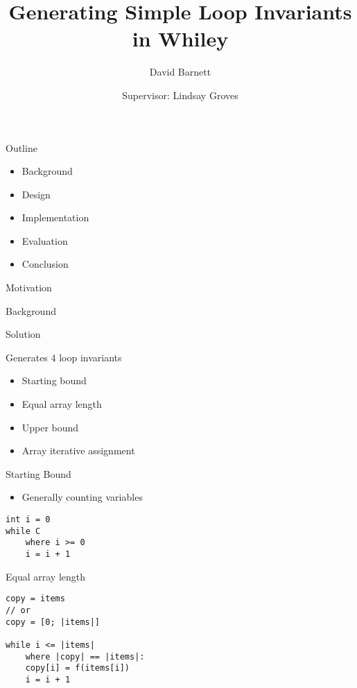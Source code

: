 \documentclass[ignorenonframetext,]{beamer}
\title{Generating Simple Loop Invariants in Whiley}
\author{David Barnett}
\date{Supervisor: Lindsay Groves}
\providecommand{\tightlist}{%
  \setlength{\itemsep}{0pt}\setlength{\parskip}{0pt}}
\begin{document}
\frame{\titlepage}

\begin{frame}{Outline}

\begin{itemize}
\tightlist
\item
  Background
\item
  Design
\item
  Implementation
\item
  Evaluation
\item
  Conclusion
\end{itemize}

\end{frame}

\begin{frame}{Motivation}

\end{frame}

\begin{frame}{Background}

\end{frame}

\begin{frame}{Solution}

Generates 4 loop invariants

\begin{itemize}
\tightlist
\item
  Starting bound
\item
  Equal array length
\item
  Upper bound
\item
  Array iterative assignment
\end{itemize}

\end{frame}

\begin{frame}[fragile]{Starting Bound}

\begin{itemize}
\tightlist
\item
  Generally counting variables
\end{itemize}

\begin{verbatim}
int i = 0
while C
    where i >= 0
    i = i + 1
\end{verbatim}

\end{frame}

\begin{frame}[fragile]{Equal array length}

\begin{verbatim}
copy = items
// or
copy = [0; |items|]

while i <= |items|
    where |copy| == |items|:
    copy[i] = f(items[i])
    i = i + 1
\end{verbatim}

\end{frame}
\end{document}
